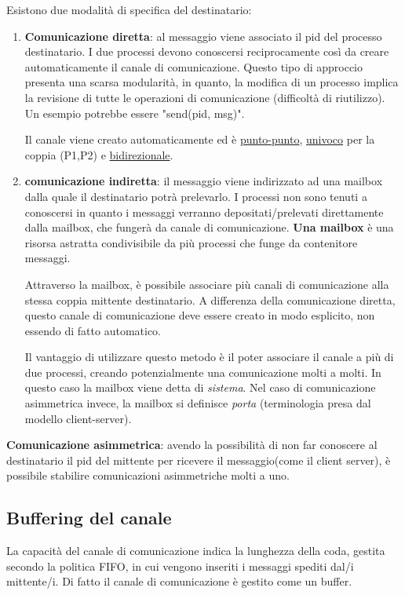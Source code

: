 \documentclass{article}
\begin{document}
\noindent Esistono due modalità di specifica del destinatario:
\begin{enumerate}
    \item \textbf{Comunicazione diretta}: al messaggio viene associato il
     pid del processo destinatario. I due processi devono conoscersi 
     reciprocamente così da creare automaticamente il canale di comunicazione.
     Questo tipo di approccio presenta una scarsa modularità, in quanto,
     la modifica di un processo implica la revisione di tutte
     le operazioni di comunicazione (difficoltà di riutilizzo).
      Un esempio potrebbe essere "send(pid, msg)". 

     Il canale viene creato automaticamente ed è \underline{punto-punto}, 
     \underline{univoco} per la coppia (P1,P2)  e \underline{bidirezionale}.

     \item \textbf{comunicazione indiretta}:
      il messaggio viene indirizzato ad una mailbox dalla quale il
      destinatario potrà prelevarlo. I processi non
      sono tenuti a conoscersi in quanto i messaggi verranno depositati/prelevati 
      direttamente dalla mailbox, che fungerà da canale di comunicazione.
     \textbf{Una mailbox} è una risorsa astratta condivisibile da più processi che funge 
     da contenitore messaggi. 

     Attraverso la mailbox, è possibile associare più canali di comunicazione alla stessa
     coppia mittente destinatario. A differenza della comunicazione diretta, questo canale di
     comunicazione deve essere creato in modo esplicito, non essendo di fatto automatico.
    \medskip

     Il vantaggio di utilizzare questo metodo è il poter associare il canale a più di
     due processi, creando potenzialmente una comunicazione molti a molti. In questo caso
     la mailbox viene detta di \textit{sistema}.
     Nel caso di comunicazione asimmetrica invece, la mailbox
     si definisce \textit{porta} (terminologia presa dal modello
     client-server).
     
\end{enumerate}
\medskip

\noindent \textbf{Comunicazione asimmetrica}: avendo la possibilità di non far conoscere al
 destinatario il pid del mittente per ricevere il messaggio(come il client server), è possibile
 stabilire comunicazioni asimmetriche molti a uno.
\medskip

\subsection{Buffering del canale}
\noindent La capacità del canale di comunicazione indica la
 lunghezza della coda, gestita secondo la politica FIFO, in cui 
 vengono inseriti i messaggi spediti dal/i mittente/i. Di fatto
 il canale di comunicazione è gestito come un buffer. 
\medskip
\end{document}
